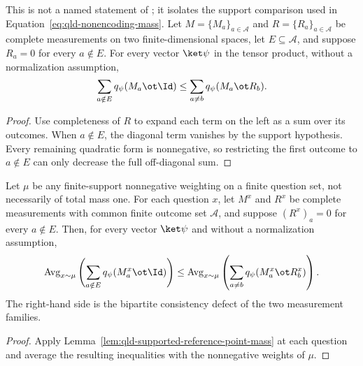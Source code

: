 	\begin{lemma}
		\label{lem:qld-supported-reference-point-mass}
		\leanok
		This is not a named statement of \cite{Ji2020MIPStar}; it isolates the
		support comparison used in Equation~\eqref{eq:qld-nonencoding-mass}. Let
		$M=\{M_a\}_{a\in\mathcal A}$ and $R=\{R_a\}_{a\in\mathcal A}$ be
		complete measurements on two finite-dimensional spaces, let
		$E\subseteq\mathcal A$, and suppose $R_a=0$ for every $a\notin E$.
		For every vector $\ket\psi$ in the tensor product, without a normalization
		assumption,
		\[
			\sum_{a\notin E}q_\psi(M_a\ot\Id)
			\leq \sum_{a\ne b}q_\psi(M_a\ot R_b).
		\]
	\end{lemma}
	\begin{proof}
		\leanok
		Use completeness of $R$ to expand each term on the left as a sum over its
		outcomes. When $a\notin E$, the diagonal term vanishes by the support
		hypothesis. Every remaining quadratic form is nonnegative, so restricting
		the first outcome to $a\notin E$ can only decrease the full off-diagonal
		sum.
	\end{proof}

	\begin{lemma}
		\label{lem:qld-supported-reference-average-mass}
		\leanok
		Let $\mu$ be any finite-support nonnegative weighting on a finite question
		set, not necessarily of total mass one. For each question $x$, let $M^x$
		and $R^x$ be complete measurements with common finite outcome set
		$\mathcal A$, and suppose $(R^x)_a=0$ for every $a\notin E$. Then, for
		every vector $\ket\psi$ and without a normalization assumption,
		\[
			\operatorname{Avg}_{x\sim\mu}
			\left(\sum_{a\notin E}q_\psi(M^x_a\ot\Id)\right)
			\leq
			\operatorname{Avg}_{x\sim\mu}
			\left(\sum_{a\ne b}q_\psi(M^x_a\ot R^x_b)\right).
		\]
		The right-hand side is the bipartite consistency defect of the two
		measurement families.
	\end{lemma}
	\begin{proof}
		\leanok
		Apply Lemma~\ref{lem:qld-supported-reference-point-mass} at each question
		and average the resulting inequalities with the nonnegative weights of
		$\mu$.
	\end{proof}

